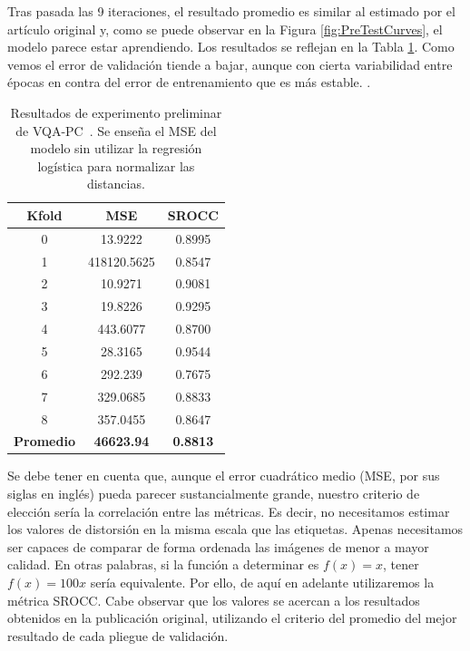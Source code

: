 Tras pasada las 9 iteraciones, el resultado promedio es similar al estimado 
por el artículo original y, como se puede observar en la Figura \ref{fig:PreTestCurves},
el modelo parece estar aprendiendo. Los resultados se reflejan
en la Tabla \ref{tab:PreTestResults}. 
Como vemos el error de validación tiende a bajar, aunque con cierta variabilidad 
entre épocas en contra del error de entrenamiento que es más estable. . 

\begin{table}[htp]
  \scriptsize
  \begin{center}
    \begin{tabular}[c]{|c|c|c|}
      \hline
      \rowcolor[HTML]{FFC702}
      \textbf{Kfold} & \textbf{MSE} & \textbf{SROCC} \\ 
      \hline 
      0 & 13.9222 & 0.8995 \\
      \hline 
      1 & 418120.5625 & 0.8547 \\ 
      \hline 
      2 & 10.9271 & 0.9081 \\
      \hline 
      3 & 19.8226 & 0.9295 \\ 
      \hline 
      4 & 443.6077 & 0.8700 \\ 
      \hline 
      5 & 28.3165 & 0.9544 \\ 
      \hline 
      6 & 292.239 & 0.7675 \\ 
      \hline 
      7 & 329.0685 & 0.8833 \\ 
      \hline 
      8 & 357.0455 & 0.8647 \\ 
      \hline
      \textbf{\cellcolor[HTML]{FFC702}Promedio} & \textbf{46623.94} & \textbf{0.8813} \\ 
      \hline
    \end{tabular}
  \end{center}
  \caption[Resultados de experimento preliminar VQA-PC.]{
    Resultados de experimento preliminar de VQA-PC~\cite{VQA-PC}. 
    Se enseña el MSE del modelo sin utilizar la regresión logística para normalizar las distancias.
  }
  \label{tab:PreTestResults}
\end{table}

Se debe tener en cuenta que, aunque el error cuadrático medio (MSE, por sus siglas en inglés) pueda parecer 
sustancialmente grande, nuestro criterio de elección sería la correlación 
entre las métricas. Es decir, no necesitamos estimar los valores de distorsión 
en la misma escala que las etiquetas. Apenas necesitamos ser capaces de comparar 
de forma ordenada las imágenes de menor a mayor calidad. En otras palabras, 
si la función a determinar es $f(x) = x$, tener $f(x) = 100x$ sería equivalente.
Por ello, de aquí en adelante utilizaremos la métrica SROCC.
Cabe observar que los valores se acercan a los resultados obtenidos en la publicación original, 
utilizando el criterio del promedio del mejor resultado de cada pliegue de validación. 


